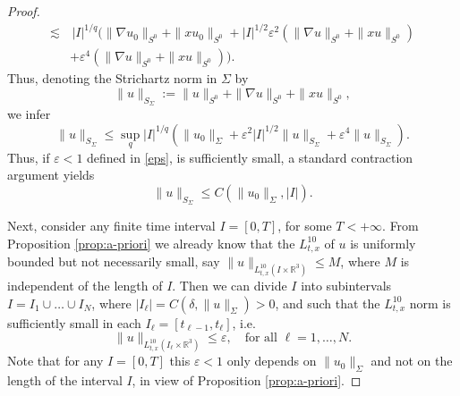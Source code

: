 \documentclass[a4paper,leqno]{amsart}
\theoremstyle{plain}
\theoremstyle{definition}
\numberwithin{equation}{section}
\begin{document}
\begin{proof}
\begin{align*}
\lesssim& \,  |I|^{1/q}\Big(\|\nabla u_0\|_{S^0}+\|xu_0\|_{S^0}+|I|^{1/2}{\varepsilon}^2(\|\nabla u\|_{S^0}+\|xu\|_{S^0})\\
&+{\varepsilon}^4(\|\nabla u\|_{S^0}+\|xu\|_{S^0})\Big).
\end{align*}
Thus, denoting the Strichartz norm in $\Sigma$ by
$$
\| u \|_{S_\Sigma}:=\| u \|_{S^0}+\|\nabla u \|_{S^0} + \| x u \|_{S^0},
$$
we infer 
\begin{equation*}\label{eq:103}
\| u \|_{S_\Sigma}{\leqslant} \sup_{q} |I|^{1/q} \left( \|u_0\|_{\Sigma} + {\varepsilon}^2 |I|^{1/2} \|u \|_{S_\Sigma} + {\varepsilon}^4 \| u \|_{S_\Sigma} \right) .
\end{equation*}
Thus, if ${\varepsilon} <1 $ defined in \eqref{eps}, is sufficiently small, a standard contraction argument yields
\begin{equation*}\label{eq:103}
\| u \|_{S_\Sigma}{\leqslant} C(\|u_0\|_{\Sigma}, |I|).
\end{equation*}

Next, consider any finite time interval $I=[0,T]$, for some $T<+ \infty$. From Proposition \ref{prop:a-priori} 
we already know that the $L^{10}_{t, x}$ of $u$ is uniformly bounded but not necessarily small, say
$
\| u \|_{L^{10}_{t, x}(I\times{{\mathbb R}}^3)}{\leqslant} M$, where $M$ is independent of the length of $I$.
Then we can divide $I$ into subintervals $I=I_1\cup\dotsc\cup I_N$, where $| I_\ell |  = C(\delta, \| u \| _{\Sigma})>0$, and such that the $L^{10}_{t,x}$ norm is sufficiently small in each $I_\ell =[t_{\ell-1}, t_\ell]$, i.e.
\begin{equation*}
\|u\|_{L^{10}_{t, x}(I_\ell \times{{\mathbb R}}^3)}{\leqslant} {\varepsilon}, \quad \textrm{for all $\ell =1, \dotsc, N$.}
\end{equation*}
Note that for any $I=[0,T]$ this ${\varepsilon} <1$ only depends on $\|u_0 \|_{\Sigma}$ and not on the length of the interval $I$, in view of Proposition \ref{prop:a-priori}. 


\end{proof}
\end{document}
